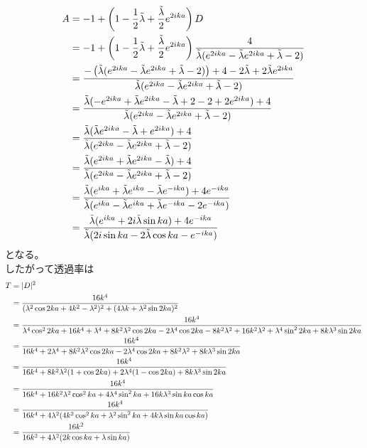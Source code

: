 \documentclass{jsarticle}  %
\numberwithin{equation}{section} %
\numberwithin{figure}{section}
\begin{document}
    \begin{align}
        A &= -1 + \left( 1-\frac{1}{2}\tilde{\lambda}  +  \frac{\tilde{\lambda}}{2}e^{2ika} \right)D \notag \\
        &=-1 + \left( 1-\frac{1}{2}\tilde{\lambda}  +  \frac{\tilde{\lambda}}{2}e^{2ika} \right)\frac{4}{\tilde{\lambda}(e^{2ika}- \tilde{\lambda}e^{2ika}+\tilde{\lambda}-2)} \notag \\
        &= \frac{-\left( \tilde{\lambda}(e^{2ika}- \tilde{\lambda}e^{2ika}+\tilde{\lambda}-2) \right) + 4 - 2\tilde{\lambda} +2\tilde{\lambda}e^{2ika}}{\tilde{\lambda}(e^{2ika}- \tilde{\lambda}e^{2ika}+\tilde{\lambda}-2)} \notag \\
        &=\frac{ \tilde{\lambda}(-e^{2ika}+ \tilde{\lambda}e^{2ika}-\tilde{\lambda}+2 -2+2e^{2ika})  + 4  }{\tilde{\lambda}(e^{2ika}- \tilde{\lambda}e^{2ika}+\tilde{\lambda}-2)} \notag \\
        &=\frac{ \tilde{\lambda}( \tilde{\lambda}e^{2ika}-\tilde{\lambda}+e^{2ika})  + 4  }{\tilde{\lambda}(e^{2ika}- \tilde{\lambda}e^{2ika}+\tilde{\lambda}-2)} \notag \\
        &=\frac{\tilde{\lambda}( e^{2ika}  + \tilde{\lambda}e^{2ika}-\tilde{\lambda})  + 4  }{\tilde{\lambda}(e^{2ika}- \tilde{\lambda}e^{2ika}+\tilde{\lambda}-2)} \notag \\
        &=\frac{\tilde{\lambda}( e^{ika}  + \tilde{\lambda}e^{ika}-\tilde{\lambda}e^{-ika})  + 4 e^{-ika} }{\tilde{\lambda}(e^{ika}- \tilde{\lambda}e^{ika}+\tilde{\lambda}e^{-ika}-2e^{-ika})} \notag \\
        &=\frac{\tilde{\lambda}( e^{ika}  + 2i\tilde{\lambda}\sin ka)  + 4 e^{-ika} }{\tilde{\lambda}(2i\sin ka- 2\tilde{\lambda}\cos ka -e^{-ika})}
    \end{align}
    となる。\\
    したがって透過率は
    \begin{align}
        T &= |D|^2\notag \\
        &= \frac{16k^4}{(\lambda^2 \cos 2ka + 4k^2 - \lambda^2)^2+(4\lambda k +\lambda^2  \sin 2ka)^2} \notag \\
        &= \frac{16k^4}{\lambda^4\cos^22ka + 16k^4 + \lambda^4+8k^2\lambda^2\cos 2ka-2\lambda^4\cos2ka-8k^2\lambda^2 + 16k^2\lambda^2 + \lambda^4 \sin^22ka + 8k\lambda^3 \sin2ka} \notag \\
        &=\frac{16k^4}{ 16k^4 + 2\lambda^4 +8k^2\lambda^2\cos 2ka-2\lambda^4\cos2ka+ 8k^2\lambda^2  + 8k\lambda^3 \sin2ka} \notag \\
        &=\frac{16k^4}{ 16k^4  +8k^2\lambda^2(1+\cos 2ka)+2\lambda^4(1-\cos2ka)  + 8k\lambda^3 \sin2ka} \notag \\
        &=\frac{16k^4}{ 16k^4  +16k^2\lambda^2\cos^2 ka+4\lambda^4\sin^2 ka  + 16k\lambda^3 \sin ka\cos ka} \notag \\
        &=\frac{16k^4}{ 16k^4  +4\lambda^2(4k^2\cos^2 ka+\lambda^2\sin^2 ka  + 4k\lambda \sin ka\cos ka)} \notag \\
        &= \frac{16k^2}{16k^2 + 4\lambda^2 (2k \cos ka + \lambda \sin ka)}
    \end{align}
\end{document}
